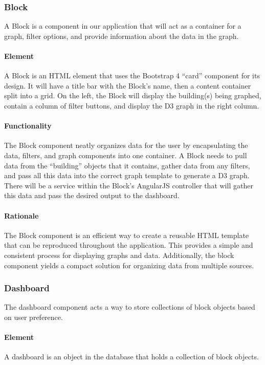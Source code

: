     \subsubsection{Block}
        A Block is a component in our application that will act as a container for a graph, filter options, and provide information about the data in the graph.
        \paragraph{Element} 
            A Block is an HTML element that uses the Bootstrap 4 ``card'' component for its design. It will have a title bar with the Block's name, then a content container split into a grid. 
            On the left, the Block will display the building(s) being graphed, contain a column of filter buttons, and display the D3 graph in the right column. 
        \paragraph{Functionality}
            The Block component neatly organizes data for the user by encapsulating the data, filters, and graph components into one container. 
            A Block needs to pull data from the ``building'' objects that it contains, gather data from any filters, and pass all this data into the correct graph template to generate a D3 graph. 
            There will be a service within the Block's AngularJS controller that will gather this data and pass the desired output to the dashboard.
        \paragraph{Rationale} 
            The Block component is an efficient way to create a reusable HTML template that can be reproduced throughout the application. 
            This provides a simple and consistent process for displaying graphs and data. Additionally, the block component yields a compact solution for organizing data from multiple sources. 
    
    \subsubsection{Dashboard}
        The dashboard component acts a way to store collections of block objects based on user preference.
        \paragraph{Element} 
            A dashboard is an object in the database that holds a collection of block objects.
